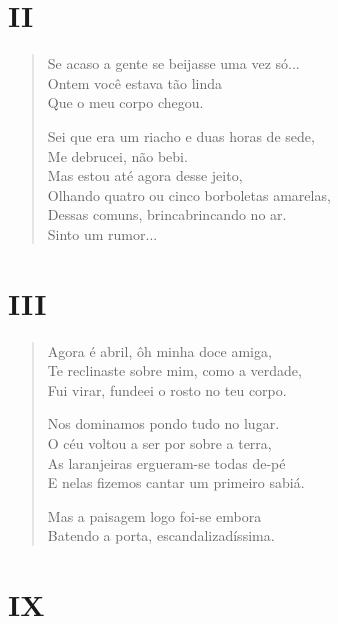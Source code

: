 \pagebreak
{}
\section{II}

\begin{verse}
Se acaso a gente se beijasse uma vez só...\\
Ontem você estava tão linda\\
Que o meu corpo chegou.

Sei que era um riacho e duas horas de sede,\\
Me debrucei, não bebi.\\
Mas estou até agora desse jeito,\\
Olhando quatro ou cinco borboletas amarelas,\\
Dessas comuns, brincabrincando no ar.\\
Sinto um rumor...
\end{verse}

\pagebreak
{}
\section{III}

\begin{verse}
Agora é abril, ôh minha doce amiga,\\
Te reclinaste sobre mim, como a verdade,\\
Fui virar, fundeei o rosto no teu corpo.

Nos dominamos pondo tudo no lugar.\\
O céu voltou a ser por sobre a terra,\\
As laranjeiras ergueram-se todas de-pé\\
E nelas fizemos cantar um primeiro sabiá.

Mas a paisagem logo foi-se embora\\
Batendo a porta, escandalizadíssima.
\end{verse}

\pagebreak
{}
\section{IX}

